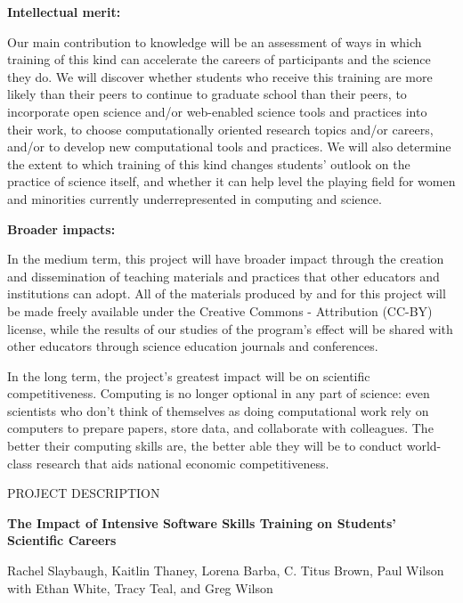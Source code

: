 \documentclass{proposalnsf}
\begin{document}
\textbf{Intellectual merit:}

Our main contribution to knowledge will be an assessment of ways in
which training of this kind can accelerate the careers of participants
and the science they do.  We will discover whether students who
receive this training are more likely than their peers to continue to
graduate school than their peers, to incorporate open science and/or
web-enabled science tools and practices into their work, to choose
computationally oriented research topics and/or careers, and/or to
develop new computational tools and practices.  We will also determine
the extent to which training of this kind changes students' outlook on
the practice of science itself, and whether it can help level the
playing field for women and minorities currently underrepresented in
computing and science.

\textbf {Broader impacts:}

In the medium term, this project will have broader impact through the
creation and dissemination of teaching materials and practices that
other educators and institutions can adopt.  All of the materials
produced by and for this project will be made freely available under
the Creative Commons - Attribution (CC-BY) license, while the results
of our studies of the program's effect will be shared with other
educators through science education journals and conferences.

In the long term, the project's greatest impact will be on scientific
competitiveness.  Computing is no longer optional in any part of
science: even scientists who don't think of themselves as doing
computational work rely on computers to prepare papers, store data,
and collaborate with colleagues.  The better their computing skills
are, the better able they will be to conduct world-class research that
aids national economic competitiveness.

\renewcommand{\thepage} {\footnotesize Project Summary}


\newpage

\pagestyle{plain}
\renewcommand{\thepage} {\arabic{page}}

\begin{center}
\small{PROJECT DESCRIPTION}


\large\textbf{The Impact of Intensive Software Skills Training on Students' Scientific Careers}

{\large \sf Rachel Slaybaugh, Kaitlin Thaney, Lorena Barba, C. Titus Brown, Paul Wilson\\ 
  with Ethan White, Tracy Teal, and Greg Wilson}

\end{center}
\end{document}
